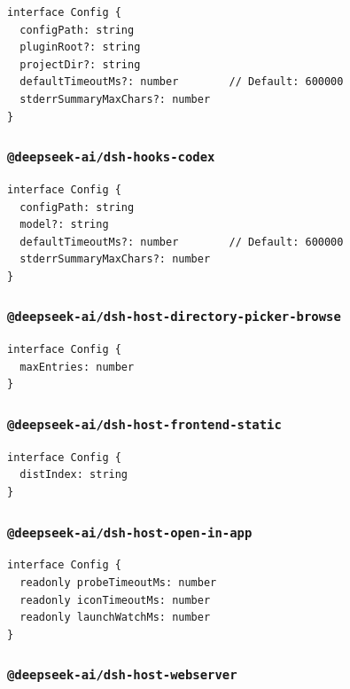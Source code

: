 \documentclass[11pt,a4paper]{article}
\begin{document}
\begin{lstlisting}
interface Config {
  configPath: string
  pluginRoot?: string
  projectDir?: string
  defaultTimeoutMs?: number        // Default: 600000
  stderrSummaryMaxChars?: number
}
\end{lstlisting}


\subsubsection*{\texttt{@deepseek-ai/dsh-hooks-codex}}


\begin{lstlisting}
interface Config {
  configPath: string
  model?: string
  defaultTimeoutMs?: number        // Default: 600000
  stderrSummaryMaxChars?: number
}
\end{lstlisting}


\subsubsection*{\texttt{@deepseek-ai/dsh-host-directory-picker-browse}}


\begin{lstlisting}
interface Config {
  maxEntries: number
}
\end{lstlisting}


\subsubsection*{\texttt{@deepseek-ai/dsh-host-frontend-static}}


\begin{lstlisting}
interface Config {
  distIndex: string
}
\end{lstlisting}


\subsubsection*{\texttt{@deepseek-ai/dsh-host-open-in-app}}


\begin{lstlisting}
interface Config {
  readonly probeTimeoutMs: number
  readonly iconTimeoutMs: number
  readonly launchWatchMs: number
}
\end{lstlisting}


\subsubsection*{\texttt{@deepseek-ai/dsh-host-webserver}}
\end{document}
